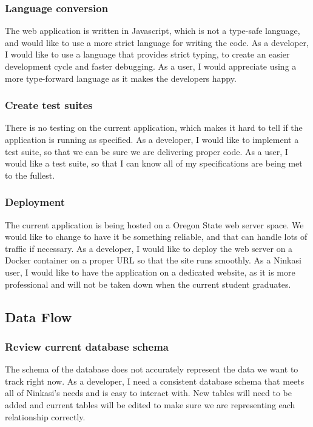 \documentclass[draftclsnofoot,onecolumn,journal,letterpaper,compsoc,10pt]{IEEEtran}
\begin{document}
        \subsubsection{Language conversion}
            The web application is written in Javascript, which is not a type-safe language, and would like to use a more strict language for writing the code.
            As a developer, I would like to use a language that provides strict typing, to create an easier development cycle and faster debugging. As a user, I would appreciate using a more type-forward language as it makes the developers happy.
        \subsubsection{Create test suites}
            There is no testing on the current application, which makes it hard to tell if the application is running as specified. As a developer, I would like to implement a test suite, so that we can be sure we are delivering proper code. As a user, I would like a test suite, so that I can know all of my specifications are being met to the fullest. 
        \subsubsection{Deployment}
            The current application is being hosted on a Oregon State web server space. We would like to change to have it be something reliable, and that can handle lots of traffic if necessary. As a developer, I would like to deploy the web server on a Docker container on a proper URL so that the site runs smoothly. As a Ninkasi user, I would like to have the application on a dedicated website, as it is more professional and will not be taken down when the current student graduates.        
    \subsection{Data Flow}
        \subsubsection{Review current database schema}
        The schema of the database does not accurately represent the data we want to track right now. As a developer, I need a consistent database schema that meets all of Ninkasi's needs and is easy to interact with. New tables will need to be added and current tables will be edited to make sure we are representing each relationship correctly.
\end{document}
